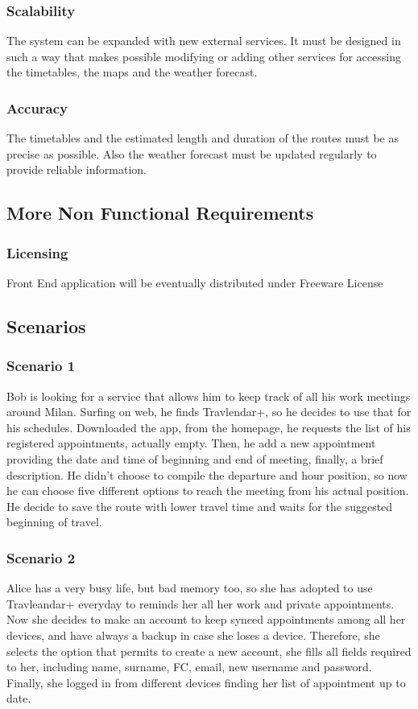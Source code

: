 \subsubsection{Scalability}
The system can be expanded with new external services. It must be designed in such a way that makes possible modifying or adding other services for accessing the timetables, the maps and the weather forecast.
\subsubsection{Accuracy}
The timetables and the estimated length and duration of the routes must be as precise as possible. Also the weather forecast must be updated regularly to provide reliable information.

\subsection{More Non Functional Requirements}

\subsubsection{Licensing}
Front End application will be eventually distributed under Freeware License


\subsection{Scenarios}
	\subsubsection{Scenario 1}
	Bob is looking for a service that allows him to keep track of all his work meetings around Milan. Surfing on web, he finds Travlendar+, so he decides to use that for his schedules. Downloaded the app, from the homepage,  he requests the list of his registered appointments, actually empty. Then, he add a new appointment providing the date and time of beginning and end of meeting, finally, a brief description. He didn’t choose to compile the departure and hour position, so now he can choose five different options to reach the meeting from his actual position. He decide to save the route with lower travel time and waits for the suggested beginning of travel.
	\subsubsection{Scenario 2}
	Alice has a very busy life, but bad memory too, so she has adopted to use Travleandar+ everyday to reminds her all her work and private appointments. Now she decides to make an account to keep synced appointments among all her devices, and have always a backup in case she loses a device. Therefore, she selects the option that permits to create a new account, she fills all fields required to her, including name, surname, FC, email, new username and password. Finally, she logged in from different devices finding her list of appointment up to date.
